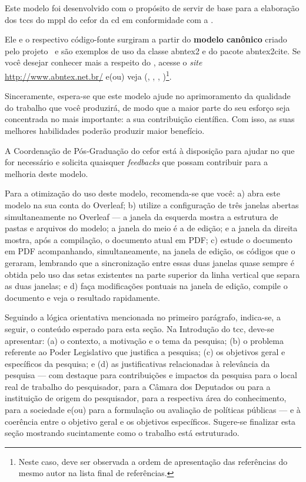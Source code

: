 Este modelo foi desenvolvido com o propósito de servir de base para a elaboração dos \acp{tcc} do \ac{mppl} do \ac{cefor} da \ac{cd} em conformidade com a .


Ele e o respectivo código-fonte surgiram a partir do \textbf{modelo canônico} criado pelo projeto \abnTeX\ e são exemplos de uso da classe \textsf{abntex2} e do pacote \textsf{abntex2cite}. Se você desejar conhecer mais a respeito do \abnTeX, acesse o \textit{site} \url{http://www.abntex.net.br/} e(ou) veja  (\citeyear{abntex2classe}, \citeyear{abntex2-wiki-como-customizar}, \citeyear{abntex2cite-alf}, \citeyear{abntex2cite})\footnote{Neste caso, deve ser observada a ordem de apresentação das referências do mesmo autor na lista final de referências.}.

Sinceramente, espera-se que este modelo ajude no aprimoramento da qualidade do trabalho que você produzirá, de modo que a maior parte do seu esforço seja concentrada no mais importante: a sua contribuição científica. Com isso, as suas melhores habilidades poderão produzir maior benefício.

A Coordenação de Pós-Graduação do \ac{cefor} está à disposição para ajudar no que for necessário e solicita quaisquer \textit{feedbacks} que possam contribuir para a melhoria deste modelo.

Para a otimização do uso deste modelo, recomenda-se que você: a) abra este modelo na sua conta do Overleaf; b) utilize a configuração de três janelas abertas simultaneamente no Overleaf --- a janela da esquerda mostra a estrutura de pastas e arquivos do modelo; a janela do meio é a de edição; e a janela da direita mostra, após a compilação, o documento atual em PDF; c) estude o documento em PDF acompanhando, simultaneamente, na janela de edição, os códigos que o geraram, lembrando que a sincronização entre essas duas janelas quase sempre é obtida pelo uso das setas existentes na parte superior da linha vertical que separa as duas janelas; e d) faça modificações pontuais na janela de edição, compile o documento e veja o resultado rapidamente.


Seguindo a lógica orientativa mencionada no primeiro parágrafo, indica-se, a seguir, o conteúdo esperado para esta seção. Na Introdução do \ac{tcc}, deve-se apresentar: (a) o contexto, a motivação e o tema da pesquisa; (b) o problema referente ao Poder Legislativo que justifica a pesquisa; (c) os objetivos geral e específicos da pesquisa; e (d) as justificativas relacionadas à relevância da pesquisa --- com destaque para contribuições e impactos da pesquisa para o local real de trabalho do pesquisador, para a Câmara dos Deputados ou para a instituição de origem do pesquisador, para a respectiva área do conhecimento, para a sociedade e(ou) para a formulação ou avaliação de políticas públicas --- e à coerência entre o objetivo geral e os objetivos específicos. Sugere-se finalizar esta seção mostrando sucintamente como o trabalho está estruturado.


